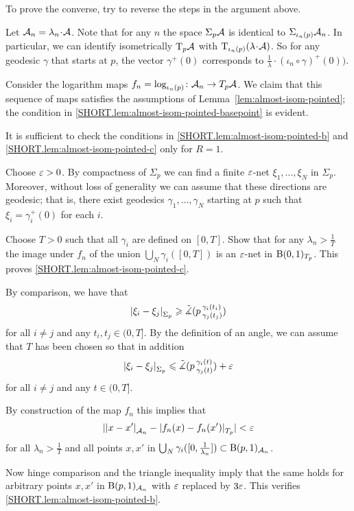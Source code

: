 To prove the converse, try to reverse the steps in the argument above.

Let  $\spc{A}_n=\lambda_n\cdot\spc{A}$.
Note that for any $n$ the space $\Sigma_p\mathcal{A}$ is identical to $\Sigma_{\iota_n(p)} \mathcal{A}_n$.
In particular, we can identify isometrically $\mathrm{T}_p\mathcal{A}$ with $\T_{\iota_n(p)}(\lambda\cdot \spc{A})$.
So for any geodesic $\gamma$ that starts at $p$, the vector $\gamma^+(0)$ corresponds to $\frac{1}{\lambda}\cdot(\iota_n\circ\gamma)^+(0))$.

Consider the logarithm maps $f_n=\log_{\iota_n(p)}\colon\mathcal{A}_n\to T_p\mathcal{A}$.
We claim that this sequence of maps satisfies the assumptions of Lemma~\ref{lem:almost-isom-pointed};
the condition in \ref{SHORT.lem:almost-isom-pointed-basepoint} is evident.  

It is sufficient to check the conditions in \ref{SHORT.lem:almost-isom-pointed-b} and \ref{SHORT.lem:almost-isom-pointed-c} only for $R=1$. 

Choose $\varepsilon>0$.
By compactness of $\Sigma_p$ we can find a finite $\varepsilon$-net $\xi_1,\dots,\xi_N$ in $\Sigma_p$. Moreover, without loss of generality we can assume that these directions are geodesic;
that is, there exist geodesics $\gamma_1,\ldots, \gamma_N$ starting at $p$ such that $\xi_i=\gamma_i^+(0)$ for each $i$.

Choose $T>0$ such that all $\gamma_i$ are defined on $[0,T]$.
Show that for any $\lambda_n>\frac{1}{T}$ the image under $f_n$ of the union $\bigcup_N\gamma_i([0,T])$ is an $\varepsilon$-net in $\mathrm{B}{}(0,1)_{T_p}$.
This proves \ref{SHORT.lem:almost-isom-pointed-c}.

By comparison, we have that
\[|{\xi_i}-{\xi_j}|_{\Sigma_p}^{{}}\geqslant \tilde\measuredangle(p\,{}^{\gamma_i(t_i)}_{\gamma_j(t_j)})\]
for all $i\ne j$ and any $t_i,t_j\in (0,T]$.
By the definition of an angle, we can assume that $T$ has been chosen so that in addition 
\[|{\xi_i}-{\xi_j}|_{\Sigma_p}^{{}}\leqslant \tilde\measuredangle(p\,{}^{\gamma_i(t)}_{\gamma_j(t)})+\varepsilon\]
for all $i\ne j$ and any $t\in (0,T]$.

By construction of the map $f_n$ this implies that 
\[||{x}-{x'}|_{\mathcal{A}_n}^{{}}-|{f_n(x)}-{f_n(x')}|_{T_p}^{{}}|<\varepsilon\]
for all $\lambda_n>\frac{1}{T}$ and all points $x,x'$ in $\bigcup_N\gamma_i([0,\frac{1}{\lambda_n}])\subset \mathrm{B}{}(p,1)_{\mathcal{A}_n}$.
  
Now hinge comparison and the triangle inequality imply that the same  holds for arbitrary points $x,x'$  in  $\mathrm{B}{}(p,1)_{\mathcal{A}_n}$ with $\varepsilon$ replaced by $3\varepsilon$.
This verifies \ref{SHORT.lem:almost-isom-pointed-b}.

